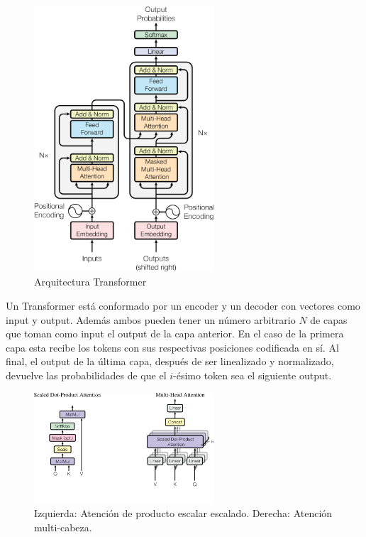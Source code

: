 \documentclass[../main.tex]{subfiles}
\begin{document}
\begin{figure}[H]
	\centering
	\includegraphics[width=0.6\textwidth]{images/g920.png}
	\caption{Arquitectura Transformer\cite{vaswani2017attention}}
\end{figure}

Un Transformer está conformado por un encoder y un decoder con vectores como input y output.
Además ambos pueden tener un número arbitrario $N$ de capas que toman como input el output de la capa anterior.
En el caso de la primera capa esta recibe los tokens con sus respectivas posiciones codificada en sí.
Al final, el output de la última capa, después de ser linealizado y normalizado,
devuelve las probabilidades de que el $i$-ésimo token sea el siguiente output.

\begin{figure}[H]
	\centering
	\includegraphics[width=0.6\textwidth]{images/g6211.png}
	\caption{Izquierda: Atención de producto escalar escalado. Derecha: Atención multi-cabeza.\cite{vaswani2017attention}}
\end{figure}
\end{document}
